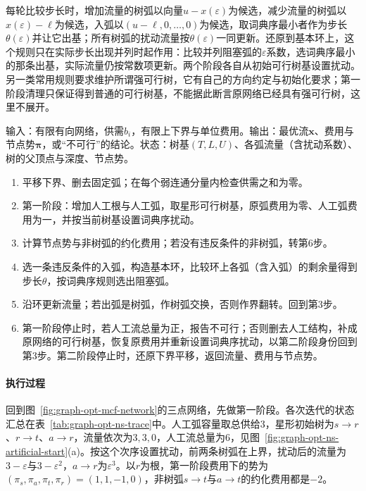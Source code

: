 每轮比较步长时，增加流量的树弧以向量$u-x(\varepsilon)$为候选，减少流量的树弧以$x(\varepsilon)-\ell$为候选，入弧以$(u-\ell,0,\ldots,0)$为候选，取词典序最小者作为步长$\theta(\varepsilon)$并让它出基；所有树弧的扰动流量按$\theta(\varepsilon)$一同更新。还原到基本环上，这个规则只在实际步长出现并列时起作用：比较并列阻塞弧的$\varepsilon$系数，选词典序最小的那条出基，实际流量仍按常数项更新。两个阶段各自从初始可行树基设置扰动。另一类常用规则要求维护所谓强可行树，它有自己的方向约定与初始化要求；第一阶段清理只保证得到普通的可行树基，不能据此断言原网络已经具有强可行树，这里不展开。

\begin{algorithm}[网络单纯形法]
\label{alg:graph-opt-network-simplex}
输入：有限有向网络，供需$b_i$，有限上下界与单位费用。输出：最优流$\bm x$、费用与节点势$\bm\pi$，或“不可行”的结论。状态：树基$(T,L,U)$、各弧流量（含扰动系数）、树的父顶点与深度、节点势。
\begin{enumerate}
  \item 平移下界、删去固定弧；在每个弱连通分量内检查供需之和为零。
  \item 第一阶段：增加人工根与人工弧，取星形可行树基，原弧费用为零、人工弧费用为一，并按当前树基设置词典序扰动。
  \item 计算节点势与非树弧的约化费用；若没有违反条件的非树弧，转第6步。
  \item 选一条违反条件的入弧，构造基本环，比较环上各弧（含入弧）的剩余量得到步长$\theta$，按词典序规则选出阻塞弧。
  \item 沿环更新流量；若出弧是树弧，作树弧交换，否则作界翻转。回到第3步。
  \item 第一阶段停止时，若人工流总量为正，报告不可行；否则删去人工结构，补成原网络的可行树基，恢复原费用并重新设置词典序扰动，以第二阶段身份回到第3步。第二阶段停止时，还原下界平移，返回流量、费用与节点势。
\end{enumerate}
\end{algorithm}

\paragraph{执行过程}
回到图~\ref{fig:graph-opt-mcf-network}的三点网络，先做第一阶段。各次迭代的状态汇总在表~\ref{tab:graph-opt-ns-trace}中。人工弧容量取总供给$3$，星形初始树为$s\to r$、$r\to t$、$a\to r$，流量依次为$3,3,0$，人工流总量为$6$，见图~\ref{fig:graph-opt-ns-artificial-start}(a)。按这个次序设置扰动，前两条树弧在上界，扰动后的流量为$3-\varepsilon$与$3-\varepsilon^2$，$a\to r$为$\varepsilon^3$。以$r$为根，第一阶段费用下的势为$(\pi_s,\pi_a,\pi_t,\pi_r)=(1,1,-1,0)$，非树弧$s\to t$与$a\to t$的约化费用都是$-2$。


